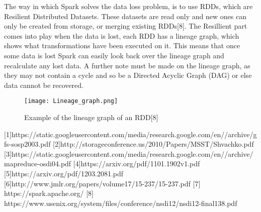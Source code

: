 The way in which Spark solves the data loss problem, is to use RDDs, which are
Resilient Distributed Datasets. These datasets are read only and new ones can
only be created from storage, or merging existing RDDs[8]. The Resillient part comes
into play when the data is lost, each RDD has a lineage graph, which shows what
transformations have been executed on it. This means that once some data is lost
Spark can easily look back over the lineage graph and recalculate any lost data.
A further note must be made on the lineage graph, as they may not contain a cycle
and so be a Directed Acyclic Graph (DAG) or else data cannot be recovered.

\begin{figure}
  \texttt{[image: Lineage\_graph.png]}
  \caption{Example of the lineage graph of an RDD[8]}
  \label{lineagegraph}
\end{figure}








[1]https://static.googleusercontent.com/media/research.google.com/en//archive/gfs-sosp2003.pdf %
[2]http://storageconference.us/2010/Papers/MSST/Shvachko.pdf %
[3]https://static.googleusercontent.com/media/research.google.com/en//archive/mapreduce-osdi04.pdf %
[4]https://arxiv.org/pdf/1101.1902v1.pdf %
[5]https://arxiv.org/pdf/1203.2081.pdf %
[6]http://www.jmlr.org/papers/volume17/15-237/15-237.pdf %
[7] https://spark.apache.org/ %
[8] https://www.usenix.org/system/files/conference/nsdi12/nsdi12-final138.pdf %
